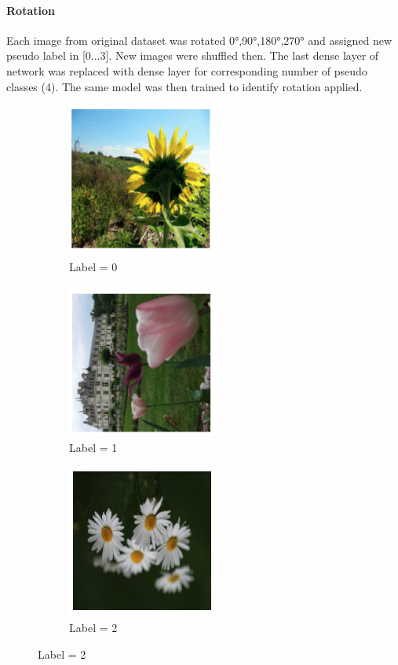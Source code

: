 \documentclass[12pt]{extarticle}
\begin{document}
\paragraph{Rotation}
Each image from original dataset was rotated 0°,90°,180°,270° and assigned new pseudo label in [0...3]. New images were shuffled then. The last dense layer of network was replaced with dense layer for corresponding number of pseudo classes (4). The same model was then trained to identify rotation applied.
\begin{figure}[!h]
  \begin{subfigure}{0.33\textwidth}
    \caption{Label = 0}
    \includegraphics[width=5cm]{images/rot_0.png}
  \end{subfigure}
  \begin{subfigure}{0.2\textwidth}
    \caption{Label = 1}
    \includegraphics[width=5cm]{images/rot_1.png}
   \end{subfigure}
  \begin{subfigure}{0.33\textwidth}
    \caption{Label = 2}
    \includegraphics[width=5cm]{images/rot_2.png}
   \end{subfigure}
\end{figure}
\end{document}
